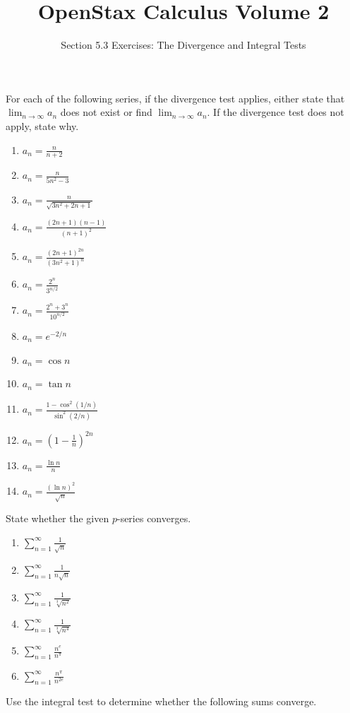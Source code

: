 \documentclass{exercises}
\title{OpenStax Calculus Volume 2}
\subtitle{Section 5.3 Exercises: The Divergence and Integral Tests}
\author{}
\date{}
\begin{document}
\maketitle


For each of the following series, if the divergence test applies, either state that $\lim_{n\to \infty}a_{n}$ does not exist or find $\lim_{n\to \infty}a_{n}$. If the divergence test does not apply, state why.

\begin{enumerate}[start=1]
\item $a_{n}=\frac{n}{n+2}$
\item $a_{n}=\frac{n}{5n^{2}-3}$
\item $a_{n}=\frac{n}{\sqrt{3n^{2}+2n+1}}$
\item $a_{n}=\frac{(2n+1)(n-1)}{{(n+1)}^{2}}$
\item $a_{n}=\frac{{(2n+1)}^{2n}}{{(3n^{2}+1)}^{n}}$
\item $a_{n}=\frac{2^{n}}{3^{n/2}}$
\item $a_{n}=\frac{2^{n}+3^{n}}{10^{n/2}}$
\item $a_{n}=e^{-2/n}$
\item $a_{n}=\cos n$
\item $a_{n}=\tan n$
\item $a_{n}=\frac{1-\cos^{2}(1/n)}{\sin^{2}(2/n)}$
\item $a_{n}={(1-\frac{1}{n})}^{2n}$
\item $a_{n}=\frac{\ln n}{n}$
\item $a_{n}=\frac{{(\ln n)}^{2}}{\sqrt{n}}$
\end{enumerate}

State whether the given $p$-series converges.

\begin{enumerate}[resume]
\item $\sum_{n=1}^{\infty}\frac{1}{\sqrt{n}}$
\item $\sum_{n=1}^{\infty}\frac{1}{n\sqrt{n}}$
\item $\sum_{n=1}^{\infty}\frac{1}{\sqrt[3]{n^{2}}}$
\item $\sum_{n=1}^{\infty}\frac{1}{\sqrt[3]{n^{4}}}$
\item $\sum_{n=1}^{\infty}\frac{n^{e}}{n^{\pi}}$
\item $\sum_{n=1}^{\infty}\frac{n^{\pi}}{n^{2e}}$
\end{enumerate}

Use the integral test to determine whether the following sums converge.
\end{document}
